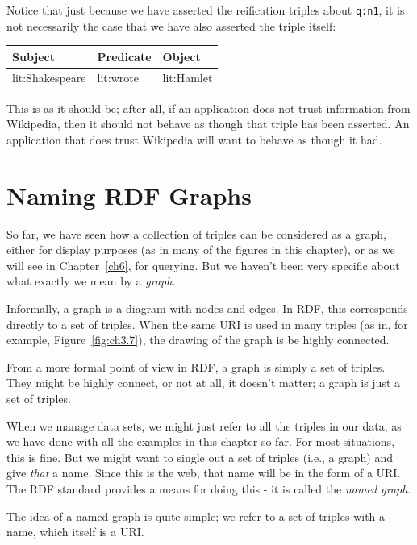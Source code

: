 \phantom{I}

Notice that just because we have asserted the reification triples about
\texttt{q:n1}, it is not necessarily the case that we have also asserted the
triple itself:

\phantom{I}

\begin{tabular}{|lll|}
\hline
Subject&Predicate&Object\\
\hline
lit:Shakespeare&lit:wrote&lit:Hamlet \\
\hline
\end{tabular}

\phantom{I}

This is as it should be; after all, if an application does not trust
information from Wikipedia, then it should not behave as though that
triple has been asserted. An application that does trust Wikipedia will
want to behave as though it had.


\section{Naming RDF Graphs}
So far, we have seen how a collection of triples can be considered as a graph,
either for display purposes (as in many of the figures in this chapter), or as we will
see in Chapter~\ref{ch6}, for querying.  But we haven't been very
specific about what exactly we mean by a \emph{graph}.

Informally, a graph is a diagram with nodes and edges.  In RDF, this
corresponds directly to a set of triples.  When the same URI is used in
many triples (as in, for example, Figure~\ref{fig:ch3.7}), the drawing
of the graph is be highly connected.

From a more formal point of view in RDF, a graph is simply a set of
triples. They might be highly connect, or not at all, it doesn't
matter; a graph is just a set of triples.

When we manage data sets, we might just refer to all the triples in
our data, as we have done with all the examples in this chapter so
far.  For most situations, this is fine.  But we might want to single
out a set of triples (i.e., a graph) and give \emph{that} a name.
Since this is the web, that name will be in the form of a URI.  The
RDF standard provides a means for doing this - it is called the
\emph{named graph}.

The idea of a named graph is quite simple; we refer to a set of
triples with a name, which itself is a URI. 

